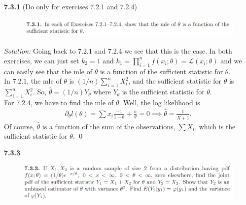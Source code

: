 \documentclass{book}
\theoremstyle{definition}
\newcommand{\p}{\partial}
\newcommand{\lag}{\mathcal{L}}
\newcommand{\f}[2]{\frac{#1}{#2}}
\begin{document}
\newpage



\noindent\textbf{7.3.1} (Do only for exercises 7.2.1 and 7.2.4)
\begin{figure}[!htb]
	\centering
	\includegraphics[scale=1]{731}
\end{figure}




\noindent \textit{Solution:} Going back to 7.2.1 and 7.2.4 we see that this is the case. In both exercises, we can just set $k_2 = 1$ and $k_1 = \prod^n_{i=1}f(x_i;\theta) = \lag(x_i;\theta)$ and we can easily see that the mle of $\theta$ is a function of the sufficient statistic for $\theta$.  \\

In 7.2.1, the mle of $\theta$ is $(1/n)\sum^n_{i=1}X_i^2$, and the sufficient statistic for $\theta$ is $\sum^n_{i=1}X_i^2$. So, $\hat\theta = (1/n)Y_\theta$ where $Y_\theta$ is the sufficient statistic for $\theta$.\\

For 7.2.4, we have to find the mle of $\theta$. Well, the log likelihood is 
\begin{align*}
\p_\theta l(\theta) = \sum x_i\f{-1}{1-\theta} + \f{n}{\theta} = 0 \implies \hat\theta = \f{1}{\bar{X}+1}.
\end{align*} 
Of course, $\hat\theta$ is a function of the sum of the observations, $\sum X_i$, which is the sufficient statistic for $\theta$. \qed




\newpage



\noindent\textbf{7.3.3}
\begin{figure}[!htb]
	\centering
	\includegraphics[scale=1]{733}
\end{figure}
\end{document}
